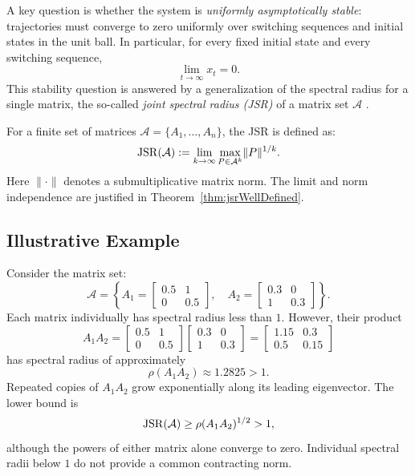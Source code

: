 A key question is whether the system is \emph{uniformly asymptotically stable}: trajectories must converge to zero uniformly over switching sequences and initial states in the unit ball.
In particular, for every fixed initial state and every switching sequence,
\[
    \lim_{t \to \infty} x_t = 0.
\]
This stability question is answered by a generalization of the spectral radius for a single matrix, the so-called \emph{joint spectral radius (JSR)} of a matrix set $\mathcal{A}$ \citep{RotaStrang1960NoteJSR}.
\begin{definition}\citep{RotaStrang1960NoteJSR}
    \label{def:jsrDefinition}
    For a finite set of matrices $\mathcal{A} = \{A_1, \dots, A_n\}$, the JSR is defined as:
    \begin{equation} \label{eq:jsr_def}
        \operatorname{JSR}(\mathcal{A}) := \lim_{k \to \infty} \max_{P \in \mathcal{A}^k}  \lVert P\rVert ^{1/k}.
    \end{equation}
    Here $\lVert \cdot\rVert $ denotes a submultiplicative matrix norm.
    The limit and norm independence are justified in Theorem~\ref{thm:jsrWellDefined}.
\end{definition}

\subsection*{Illustrative Example}

Consider the matrix set:
\[
    \mathcal{A} = \left\{ A_1 =
    \begin{bmatrix}
        0.5 & 1 \\
        0 & 0.5
    \end{bmatrix}, \quad
    A_2 =
    \begin{bmatrix}
        0.3 & 0 \\
        1 & 0.3
    \end{bmatrix}
    \right\}.
\]
Each matrix individually has spectral radius less than $1$.
However, their product
\[
    A_1 A_2 =
    \begin{bmatrix}
        0.5 & 1 \\
        0 & 0.5
    \end{bmatrix}
    \begin{bmatrix}
        0.3 & 0 \\
        1 & 0.3
    \end{bmatrix}
    =
    \begin{bmatrix}
        1.15 & 0.3 \\
        0.5 & 0.15
    \end{bmatrix}
\]
has spectral radius of approximately
\[
    \rho(A_1 A_2) \approx 1.2825 > 1.
\]
Repeated copies of $A_1A_2$ grow exponentially along its leading eigenvector.
The lower bound is
\[
    \operatorname{JSR}(\mathcal{A})\geq\rho(A_1A_2)^{1/2}>1,
\]
although the powers of either matrix alone converge to zero.
Individual spectral radii below $1$ do not provide a common contracting norm.

